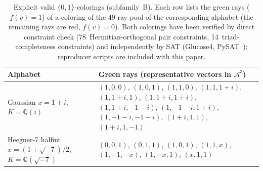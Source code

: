 \documentclass[12pt,a4paper]{article}
\newcommand{\Q}{\mathbb{Q}}
\begin{document}
\begin{table}[h]
\centering
\caption{Explicit valid $\{0,1\}$-colorings (subfamily~B).
Each row lists the green rays ($f(v) = 1$) of a coloring of the
49-ray pool of the corresponding alphabet (the remaining rays are
red, $f(v) = 0$).  Both colorings have been verified by direct
constraint check (78~Hermitian-orthogonal pair constraints,
14~triad-completeness constraints) and independently by SAT
(Glucose4, PySAT~\cite{AudemardSimon2018}); reproducer scripts are
included with this paper.}\label{tab:explicit-colorings}
\small
\begin{tabular}{@{}p{}p{}@{}}
\toprule
Alphabet & Green rays (representative vectors in $\mathcal A^3$) \\
\midrule
Gaussian \newline $x = 1+i$, $K=\Q(i)$ &
  $(1,0,0)$,
  $(1,0,1)$,
  $(1,1,0)$,
  $(1,1,1{+}i)$,
  $(1,1{+}i,1)$,
  $(1,1{+}i,1{+}i)$,
  $(1,1{+}i,-1{-}i)$,
  $(1,-1{-}i,1{+}i)$,
  $(1,-1{-}i,-1{-}i)$,
  $(1{+}i,1,1)$,
  $(1{+}i,1,-1)$
  \\
\midrule
Heegner-7 halfint \newline $x = (1{+}\sqrt{-7})/2$, \newline
$K = \Q(\sqrt{-7})$ &
  $(0,0,1)$,
  $(0,1,1)$,
  $(1,0,1)$,
  $(1,1,x)$,
  $(1,-1,-x)$,
  $(1,-x,1)$,
  $(x,1,1)$
  \\
\bottomrule
\end{tabular}
\end{table}
\end{document}
